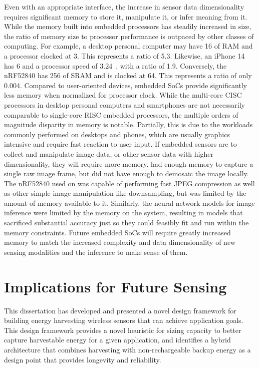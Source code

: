 Even with an appropriate interface, the increase in sensor data dimensionality requires significant memory to store it, manipulate it, or infer meaning from it.
While the memory built into embedded processors has steadily increased in size, the ratio of memory size to processor performance is outpaced by other classes of computing.
For example, a desktop personal computer may have 
16\ssi{\giga\byte} of RAM and a processor clocked at 3\ssi{\giga\hertz}. 
This represents a ratio of 5.3\ssi[per-mode=symbol]{\byte\per\hertz}.
Likewise, an iPhone 14 has 6\ssi{\giga\byte} and a processor speed of 3.24\ssi{\giga\hertz}~\cite{iphone14}, with a ratio of 1.9\ssi[per-mode=symbol]{\byte\per\hertz}.
Conversely, the nRF52840 
has 256\ssi{\kilo\byte} of SRAM and  
is clocked at 64\ssi{\mega\hertz}. This represents a ratio of only \num{0.004}\ssi[per-mode=symbol]{\byte\per\hertz}.
Compared to user-oriented devices, embedded SoCs provide significantly less memory when normalized for processor clock.
While the multi-core CISC processors in desktop personal computers and smartphones are not necessarily comparable to single-core RISC embedded processors, the multiple orders of magnitude disparity in memory is notable.
Partially, this is due to the workloads commonly performed on desktops and phones, which are usually graphics intensive and require fast reaction to user input.
If embedded sensors are to collect and manipulate image data, or other sensor data with higher dimensionality, they will require more memory.
\namec had enough memory to capture a single raw image frame, but did not have enough to demosaic the image locally.
The nRF52840 used on \namec was capable of performing fast JPEG compression as well as other simple image manipulation like downsampling, but was limited by the amount of memory available to it.
Similarly, the neural network models for image inference were limited by the memory on the system, resulting in models that sacrificed substantial accuracy just so they could feasibly fit and run within the memory constraints.
Future embedded SoCs will require greatly increased memory to match the increased complexity and data dimensionality of new sensing modalities and the inference to make sense of them.

\section{Implications for Future Sensing}
This dissertation has developed and presented a novel design framework for building energy harvesting wireless sensors that can achieve application goals. 
This design framework provides a novel heuristic for sizing capacity to better capture harvestable energy for a given application, and identifies a hybrid architecture that combines harvesting with non-rechargeable backup energy as a design point that provides longevity and reliability.

